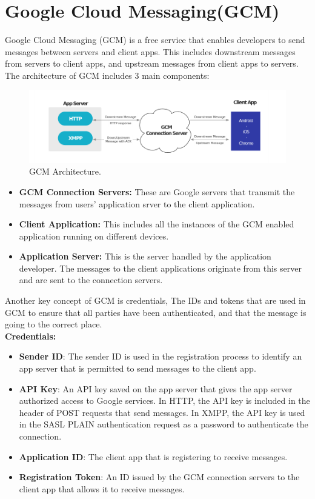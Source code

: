 \section{Google Cloud Messaging(GCM)}
Google Cloud Messaging (GCM) is a free service that enables developers
to send messages between servers and client apps. This includes
downstream messages from servers to client apps, and upstream
messages from client apps to servers. The architecture of GCM includes 3 main components:
\begin{figure}
\centering
\includegraphics[width=15cm]{images/arch.png}
\caption{\label{fig:arch}GCM Architecture.}
\end{figure} 
\begin{itemize}
	    \item \textbf{GCM Connection Servers: }These are Google servers that transmit the messages from users' application srver to the client application.
	    \item \textbf{Client Application: }This includes all the instances of the GCM enabled application running on different devices.
	    \item \textbf{Application Server: }This is the server handled by the application developer. The messages to the client applications originate from this server and are sent to the connection servers.
  \end{itemize}

Another key concept of GCM is credentials, The IDs and tokens that are used in GCM to ensure that all parties have been authenticated, and that the message is going to the correct place.\\
\textbf{Credentials:}
\begin{itemize}
	    \item \textbf{Sender ID}: The sender ID is used in the registration process to identify an app server that is permitted to send messages to the client app.
	    \item \textbf{API Key}: An API key saved on the app server that gives the app server authorized access to Google services. In HTTP, the API key is included in the header of POST requests that send messages. In XMPP, the API key is used in the SASL PLAIN authentication request as a password to authenticate the connection.
	    \item \textbf{Application ID}: The client app that is registering to receive messages.
	    \item \textbf{Registration Token}: An ID issued by the GCM connection servers to the client app that allows it to receive messages.
	\end{itemize}
